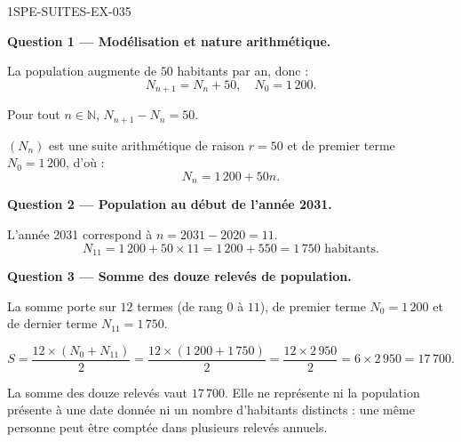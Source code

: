 \begin{corrige}{1SPE-SUITES-EX-035}

\textbf{Question 1 — Modélisation et nature arithmétique.}

La population augmente de $50$ habitants par an, donc :
\[
  N_{n+1} = N_n + 50, \quad N_0 = 1\,200.
\]

Pour tout $n \in \mathbb{N}$, $N_{n+1} - N_n = 50$.


$(N_n)$ est une suite arithmétique de raison $r = 50$ et de premier terme $N_0 = 1\,200$, d'où :
\[
  N_n = 1\,200 + 50n.
\]

\medskip
\textbf{Question 2 — Population au début de l'année 2031.}

L'année 2031 correspond à $n = 2031 - 2020 = 11$.
\[
  N_{11} = 1\,200 + 50 \times 11 = 1\,200 + 550 = 1\,750 \text{ habitants}.
\]

\medskip
\textbf{Question 3 — Somme des douze relevés de population.}

La somme porte sur $12$ termes (de rang $0$ à $11$), de premier terme $N_0 = 1\,200$ et de dernier terme $N_{11} = 1\,750$.


\[
  S = \frac{12 \times (N_0 + N_{11})}{2} = \frac{12 \times (1\,200 + 1\,750)}{2} = \frac{12 \times 2\,950}{2} = 6 \times 2\,950 = 17\,700.
\]

La somme des douze relevés vaut $17\,700$. Elle ne représente ni la population présente à une date donnée ni un nombre d'habitants distincts : une même personne peut être comptée dans plusieurs relevés annuels.


\end{corrige}

